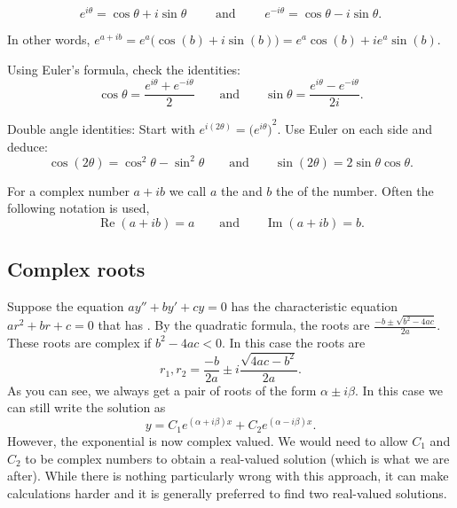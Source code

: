 \begin{theorem} \label{eulersformula}
\begin{equation*}
\boxed{~~
e^{i \theta} = \cos \theta + i \sin \theta
\qquad \text{ and } \qquad
e^{- i \theta} = \cos \theta - i \sin \theta .
~~}
\end{equation*}
\end{theorem}

In other words, $e^{a+ib} = e^a \bigl( \cos(b) + i \sin(b) \bigr) = e^a \cos(b) + i e^a \sin(b)$.

\begin{exercise}
Using Euler's formula, check the identities:
\begin{equation*}
\cos \theta = \frac{e^{i \theta} + e^{-i \theta}}{2}
\qquad \text{and} \qquad
\sin \theta = \frac{e^{i \theta} - e^{-i \theta}}{2i}.
\end{equation*}
\end{exercise}

\begin{exercise}
Double angle identities:
Start with $e^{i(2\theta)} = {\bigl(e^{i \theta} \bigr)}^2$.  Use Euler on
each side and deduce:
\begin{equation*}
\cos (2\theta) = \cos^2 \theta - \sin^2 \theta
\qquad \text{and} \qquad
\sin (2\theta) = 2 \sin \theta \cos \theta .
\end{equation*}
\end{exercise}

For a complex number $a+ib$ we call
$a$ the \emph{} and $b$ the \emph{} of the number.
Often the following notation is used,
\begin{equation*}
\operatorname{Re}(a+ib) = a
\qquad \text{and} \qquad
\operatorname{Im}(a+ib) = b.
\end{equation*}

\subsection{Complex roots}

Suppose the equation $ay'' + by' + cy = 0$ has the 
characteristic equation
$a r^2 + b r + c = 0$ that has .
By the quadratic
formula, the roots are
$\frac{-b \pm \sqrt{b^2 - 4ac}}{2a}$.
These roots are complex if $b^2 - 4ac < 0$.  In this case the
roots are
\begin{equation*}
r_1, r_2 = \frac{-b}{2a} \pm i\frac{\sqrt{4ac - b^2}}{2a} .
\end{equation*}
As you can see, we always get a pair of roots of the form $\alpha \pm i
\beta$.  In this case we can still write the solution as
\begin{equation*}
y = C_1 e^{(\alpha+i\beta)x} + C_2 e^{(\alpha-i\beta)x} .
\end{equation*}
However, the exponential is now complex valued.  We would need to allow
$C_1$ and $C_2$ to be complex numbers to obtain a real-valued solution (which
is what we are after).  While there is nothing particularly wrong with this
approach,
it can make calculations harder and it is generally preferred
to find two real-valued
solutions.

